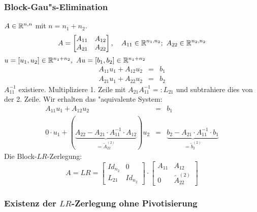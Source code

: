 \documentclass{scrartcl}
\begin{document}
\subsubsection{Block-Gau"s-Elimination}
$A \in \mathbb{R}^{n,n}$ mit $n = n_1 + n_2$.
$$A = \left[ \begin{matrix} A_{11} & A_{12} \\ A_{21} & A_{22} \end{matrix} \right], \quad A_{11} \in \mathbb{R}^{n_1, n_2}; \ A_{22} \in \mathbb{R}^{n_2, n_2}$$
$u = [ u_1, u_2 ] \in \mathbb{R}^{n_1 + n_2}, \ Au = [ b_1, b_2 ] \in \mathbb{R}^{n_1 + n_2}$
\begin{eqnarray*}
A_{11} u_1 + A_{12} u_2 & = & b_1 \\
A_{21} u_1 + A_{22} u_2 & = & b_2
\end{eqnarray*}
$A_{11}^{-1}$ existiere. Multipliziere 1. Zeile mit $A_{21} A_{11}^{-1} =: L_{21}$ und subtrahiere dies von der 2. Zeile. Wir erhalten das "aquivalente System:
\begin{eqnarray*}
A_{11} u_1 + A_{12} u_2 & = & b_1 \\
0 \cdot u_1 + (\underbrace{A_{22} - A_{21} \cdot A_{11}^{-1} \cdot A_{12}}_{=\tilde A_{22}^{(2)}}) u_2 & = & \underbrace{b_2 - A_{21} \cdot A_{11}^{-1} \cdot b_1}_{=\tilde b_2^{(2)}}
\end{eqnarray*}
Die Block-$LR$-Zerlegung:
$$A = LR = \left[ \begin{matrix} Id_{n_2} & 0 \\ L_{21} & Id_{n_2} \end{matrix} \right] \cdot \left[ \begin{matrix} A_{11} & A_{12} \\ 0 & \tilde A_{22}^{(2)} \end{matrix} \right]$$

\subsubsection{Existenz der $LR$-Zerlegung ohne Pivotisierung}
\end{document}
